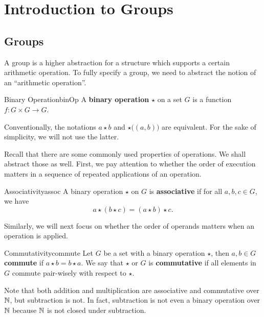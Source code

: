 \documentclass[math]{amznotes}
\theoremstyle{remark}
\newcommand{\0}{\mathbf{0}}
\newcommand{\1}{\mathbf{1}}
\begin{document}
\tableofcontents

\chapter{Introduction to Groups}
\section{Groups}
A group is a higher abstraction for a structure which supports a certain arithmetic operation. To fully specify a group, we need to abstract the notion of an ``arithmetic operation''.
\begin{dfnbox}{Binary Operation}{binOp}
    A {\color{red} \textbf{binary operation}} $\star$ on a set $G$ is a function $f \colon G \times G \to G$. 
\end{dfnbox}
Conventionally, the notations $a \star b$ and $\star\bigl(\left(a, b\right)\bigr)$ are equivalent. For the sake of simplicity, we will not use the latter.

Recall that there are some commonly used properties of operations. We shall abstract those as well. First, we pay attention to whether the order of execution matters in a sequence of repeated applications of an operation.
\begin{dfnbox}{Associativity}{assoc}
    A binary operation $\star$ on $G$ is {\color{red} \textbf{associative}} if for all $a, b, c \in G$, we have
    \begin{equation*}
        a \star \left(b \star c\right) = \left(a \star b\right) \star c.
    \end{equation*}
\end{dfnbox}
Similarly, we will next focus on whether the order of operands matters when an operation is applied.
\begin{dfnbox}{Commutativity}{commute}
    Let $G$ be a set with a binary operation $\star$, then $a, b \in G$ {\color{red} \textbf{commute}} if $a \star b = b \star a$. We say that $\star$ or $G$ is {\color{red} \textbf{commutative}} if all elements in $G$ commute pair-wisely with respect to $\star$.
\end{dfnbox}
Note that both addition and multiplication are associative and commutative over $\mathbb{N}$, but subtraction is not. In fact, subtraction is not even a binary operation over $\mathbb{N}$ because $\mathbb{N}$ is not closed under subtraction.
\end{document}
